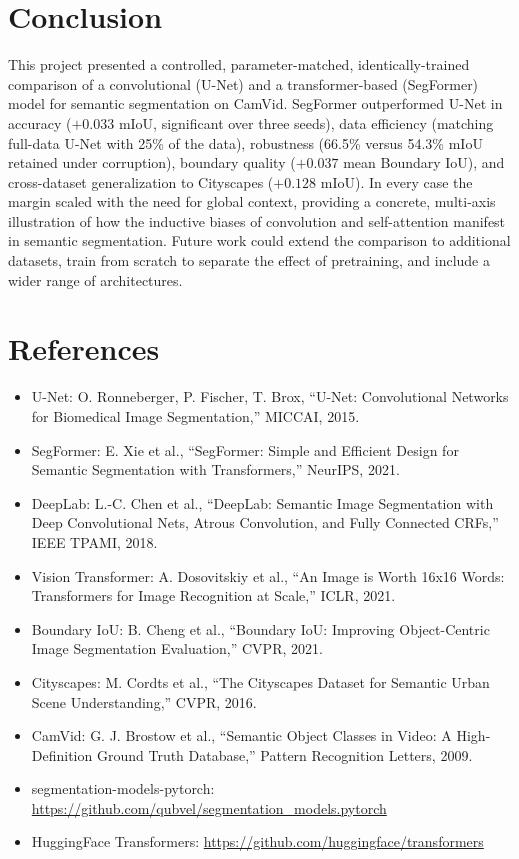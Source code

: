 \documentclass[11pt,a4paper]{article}
\begin{document}
\section{Conclusion}

This project presented a controlled, parameter-matched, identically-trained
comparison of a convolutional (U-Net) and a transformer-based (SegFormer) model
for semantic segmentation on CamVid. SegFormer outperformed U-Net in accuracy
($+0.033$ mIoU, significant over three seeds), data efficiency (matching
full-data U-Net with 25\% of the data), robustness (66.5\% versus 54.3\% mIoU
retained under corruption), boundary quality ($+0.037$ mean Boundary IoU), and
cross-dataset generalization to Cityscapes ($+0.128$ mIoU). In every case the
margin scaled with the need for global context, providing a concrete,
multi-axis illustration of how the inductive biases of convolution and
self-attention manifest in semantic segmentation. Future work could extend the
comparison to additional datasets, train from scratch to separate the effect of
pretraining, and include a wider range of architectures.

\section*{References}

\begin{itemize}
  \item U-Net: O. Ronneberger, P. Fischer, T. Brox, ``U-Net: Convolutional
  Networks for Biomedical Image Segmentation,'' MICCAI, 2015.
  \item SegFormer: E. Xie et al., ``SegFormer: Simple and Efficient Design for
  Semantic Segmentation with Transformers,'' NeurIPS, 2021.
  \item DeepLab: L.-C. Chen et al., ``DeepLab: Semantic Image Segmentation
  with Deep Convolutional Nets, Atrous Convolution, and Fully Connected CRFs,''
  IEEE TPAMI, 2018.
  \item Vision Transformer: A. Dosovitskiy et al., ``An Image is Worth
  16x16 Words: Transformers for Image Recognition at Scale,'' ICLR, 2021.
  \item Boundary IoU: B. Cheng et al., ``Boundary IoU: Improving Object-Centric
  Image Segmentation Evaluation,'' CVPR, 2021.
  \item Cityscapes: M. Cordts et al., ``The Cityscapes Dataset for Semantic
  Urban Scene Understanding,'' CVPR, 2016.
  \item CamVid: G. J. Brostow et al., ``Semantic Object Classes in Video:
  A High-Definition Ground Truth Database,'' Pattern Recognition Letters, 2009.
  \item segmentation-models-pytorch: \url{https://github.com/qubvel/segmentation_models.pytorch}
  \item HuggingFace Transformers: \url{https://github.com/huggingface/transformers}
\end{itemize}
\end{document}
